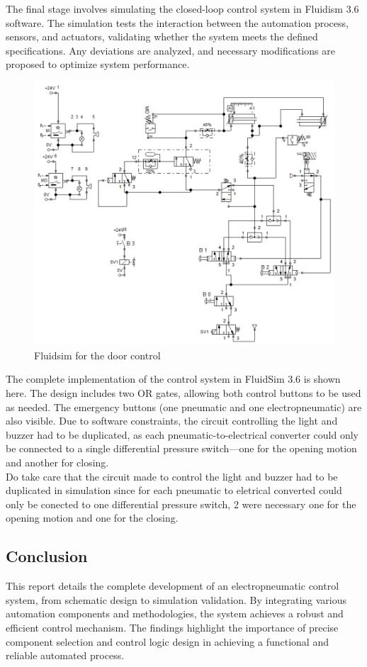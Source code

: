The final stage involves simulating the closed-loop control system in Fluidism 3.6 software. 
The simulation tests the interaction between the automation process, sensors, and actuators, 
validating whether the system meets the defined specifications. Any deviations are analyzed, 
and necessary modifications are proposed to optimize system performance.

\begin{figure}[H]
    \includegraphics[width=16cm]{Images/fluidsim.png}
    \centering
    \caption{Fluidsim for the door control}
    \label{fig:fluidsim}
\end{figure}

The complete implementation of the control system in FluidSim 3.6 is shown here. The design includes two OR gates, 
allowing both control buttons to be used as needed. The emergency buttons (one pneumatic and one electropneumatic) 
are also visible. Due to software constraints, the circuit controlling the light and buzzer had to be duplicated, as 
each pneumatic-to-electrical converter could only be connected to a single differential pressure switch—one for the 
opening motion and another for closing.\\

Do take care that the circuit made to control the light and buzzer had to be duplicated in simulation 
since for each pneumatic to eletrical converted could only be conected to one differential pressure switch, 2 were necessary
one for the opening motion and one for the closing.

\subsection{Conclusion}

This report details the complete development of an electropneumatic control system, from schematic 
design to simulation validation. By integrating various automation components and methodologies, 
the system achieves a robust and efficient control mechanism. The findings highlight the importance 
of precise component selection and control logic design in achieving a functional and reliable 
automated process.